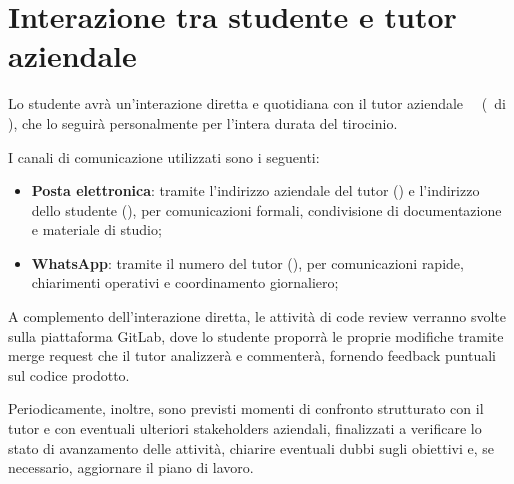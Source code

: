 \section*{Interazione tra studente e tutor aziendale}

Lo studente avrà un'interazione diretta e quotidiana con il tutor aziendale \nomeTutorAziendale\ \cognomeTutorAziendale\ (\ruoloTutorAziendale\ di \ragioneSocAzienda), che lo seguirà personalmente per l'intera durata del tirocinio.

I canali di comunicazione utilizzati sono i seguenti:
\begin{itemize}
    \item \textbf{Posta elettronica}: tramite l'indirizzo aziendale del tutor (\emailTutorAziendale) e l'indirizzo dello studente (\emailStudente), per comunicazioni formali, condivisione di documentazione e materiale di studio;
    \item \textbf{WhatsApp}: tramite il numero del tutor (\telTutorAziendale), per comunicazioni rapide, chiarimenti operativi e coordinamento giornaliero;
\end{itemize}

A complemento dell'interazione diretta, le attività di code review verranno svolte sulla piattaforma GitLab, dove lo studente proporrà le proprie modifiche tramite merge request che il tutor analizzerà e commenterà, fornendo feedback puntuali sul codice prodotto.

Periodicamente, inoltre, sono previsti momenti di confronto strutturato con il tutor e con eventuali ulteriori stakeholders aziendali, finalizzati a verificare lo stato di avanzamento delle attività, chiarire eventuali dubbi sugli obiettivi e, se necessario, aggiornare il piano di lavoro.